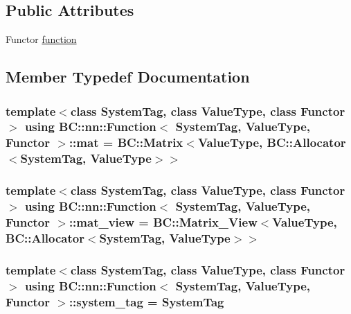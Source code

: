 \subsection*{Public Attributes}
\begin{DoxyCompactItemize}
\item 
Functor \hyperlink{classBC_1_1nn_1_1Function_ac503d1f164e9377e7446cc7aa2113963}{function}
\end{DoxyCompactItemize}


\subsection{Member Typedef Documentation}
\subsubsection[{\texorpdfstring{mat}{mat}}]{\setlength{\rightskip}{0pt plus 5cm}template$<$class System\+Tag, class Value\+Type, class Functor$>$ using {\bf B\+C\+::nn\+::\+Function}$<$ System\+Tag, Value\+Type, Functor $>$\+::{\bf mat} =  {\bf B\+C\+::\+Matrix}$<$Value\+Type, {\bf B\+C\+::\+Allocator}$<$System\+Tag, Value\+Type$>$$>$}\hypertarget{classBC_1_1nn_1_1Function_a3b600b13f8145a475fceeead09ccf827}{}\label{classBC_1_1nn_1_1Function_a3b600b13f8145a475fceeead09ccf827}
\subsubsection[{\texorpdfstring{mat\+\_\+view}{mat_view}}]{\setlength{\rightskip}{0pt plus 5cm}template$<$class System\+Tag, class Value\+Type, class Functor$>$ using {\bf B\+C\+::nn\+::\+Function}$<$ System\+Tag, Value\+Type, Functor $>$\+::{\bf mat\+\_\+view} =  {\bf B\+C\+::\+Matrix\+\_\+\+View}$<$Value\+Type, {\bf B\+C\+::\+Allocator}$<$System\+Tag, Value\+Type$>$$>$}\hypertarget{classBC_1_1nn_1_1Function_ac1e30031ee79cf0839d104cf85db3419}{}\label{classBC_1_1nn_1_1Function_ac1e30031ee79cf0839d104cf85db3419}
\subsubsection[{\texorpdfstring{system\+\_\+tag}{system_tag}}]{\setlength{\rightskip}{0pt plus 5cm}template$<$class System\+Tag, class Value\+Type, class Functor$>$ using {\bf B\+C\+::nn\+::\+Function}$<$ System\+Tag, Value\+Type, Functor $>$\+::{\bf system\+\_\+tag} =  System\+Tag}\hypertarget{classBC_1_1nn_1_1Function_a53b53a2a2a9f335e5ac57d8d38ef9331}{}\label{classBC_1_1nn_1_1Function_a53b53a2a2a9f335e5ac57d8d38ef9331}
